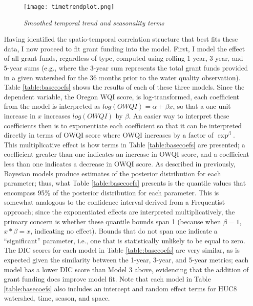 \documentclass[11pt,a4paper,titlepage]{article}
\begin{document}
\begin{figure}[!htbp]
\graphicspath{ {`/Users/TScott/Google\space Drive/quinalt/APPAM_2014/'}}
\label{fig:timetrend}
\noindent
\texttt{[image: timetrendplot.png]}
\caption{\textit{Smoothed temporal trend and seasonality terms}}
\end{figure}

Having identified the spatio-temporal correlation structure that best fits these data, I now proceed to fit grant funding into the model. First, I model the effect of all grant funds, regardless of type, computed using rolling 1-year, 3-year, and 5-year sums (e.g., where the 3-year sum represents the total grant funds provided in a given watershed for the 36 months prior to the water quality observation). Table \ref{table:basecoefs} shows the results of each of these three models. Since the dependent variable, the Oregon WQI score, is log-transformed, each coefficient from the model is interpreted as $log(OWQI) =\alpha+\beta x$, so that a one unit increase in $x$ increases $log(OWQI)$ by $\beta$. An easier way to interpret these coefficients then is to exponentiate each coefficient so that it can be interpreted directly in terms of OWQI score where OWQI increases by a factor of $\exp^{\beta}$. This multiplicative effect is how terms in Table \ref{table:basecoefs} are presented; a coefficient greater than one indicates an increase in OWQI score, and a coefficient less than one indicates a decrease in OWQI score. As described in previously, Bayesian models produce estimates of the posterior distribution for each parameter; thus, what Table \ref{table:basecoefs} presents is the quantile values that encompass 95\% of the posterior distribution for each parameter. This is somewhat analogous to the confidence interval derived from a Frequentist approach; since the exponentiated effects are interpreted multiplicatively, the primary concern is whether these quantile bounds span 1 (because when $\beta=1$, $x*\beta=x$, indicating no effect). Bounds that do not span one indicate a “significant” parameter, i.e., one that is statistically unlikely to be equal to zero. The DIC scores for each model in Table \ref{table:basecoefs} are very similar, as is expected given the similarity between the 1-year, 3-year, and 5-year metrics; each model has a lower DIC score than Model 3 above, evidencing that the addition of grant funding does improve model fit. Note that each model in Table \ref{table:basecoefs} also includes an intercept and random effect terms for HUC8 watershed, time, season, and space.
\end{document}
